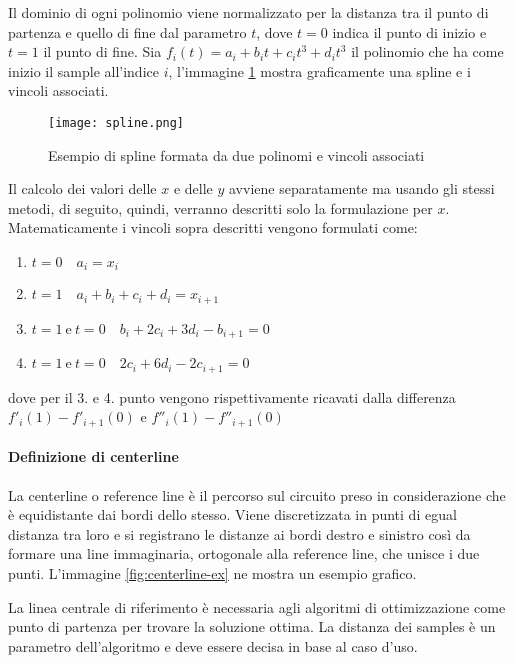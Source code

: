 Il dominio di ogni polinomio viene normalizzato per la distanza tra il punto di partenza e quello di fine
dal parametro $t$, dove $t = 0$ indica il punto di inizio e $t = 1$ il punto di fine.
Sia $f_i(t) = a_i + b_i t + c_i t^3 + d_i t^3$ il polinomio che ha come inizio il sample all'indice $i$,
l'immagine \ref{fig:spline} mostra graficamente una spline e i vincoli associati.

\begin{figure}
	\begin{center}
		\texttt{[image: spline.png]}
	\end{center}
	\caption{Esempio di spline formata da due polinomi e vincoli associati \cite{lection22}}
	\label{fig:spline}
\end{figure}

Il calcolo dei valori delle $x$ e delle $y$ avviene separatamente ma usando gli stessi metodi, di
seguito, quindi, verranno descritti solo la formulazione per $x$.
Matematicamente i vincoli sopra descritti vengono formulati come:
\begin{enumerate}
	\item $t = 0 \quad a_i = x_i$
	\item $t = 1 \quad a_i + b_i + c_i + d_i = x_{i+1}$
	\item $t = 1\ \text{e}\ t = 0 \quad b_i + 2 c_i + 3 d_i - b_{i+1} = 0$
	\item $t = 1\ \text{e}\ t = 0 \quad 2 c_i + 6 d_i - 2 c_{i+1} = 0$
\end{enumerate}
dove per il 3. e 4. punto vengono rispettivamente ricavati dalla differenza \\
$f'_i(1) - f'_{i+1}(0)$ e $f''_i(1) - f''_{i+1}(0)$


\paragraph{Definizione di centerline}
\label{par:centerline}
La centerline o reference line è il percorso sul circuito preso in considerazione che è equidistante dai
bordi dello stesso. Viene discretizzata in punti di egual distanza tra loro e si registrano le distanze
ai bordi destro e sinistro così da formare una line immaginaria, ortogonale alla reference line, che unisce
i due punti. L'immagine \ref{fig:centerline-ex} ne mostra un esempio grafico.

La linea centrale di riferimento è necessaria agli algoritmi di ottimizzazione come punto di partenza per
trovare la soluzione ottima.
La distanza dei samples è un parametro dell'algoritmo e deve essere decisa in base al caso d'uso.

